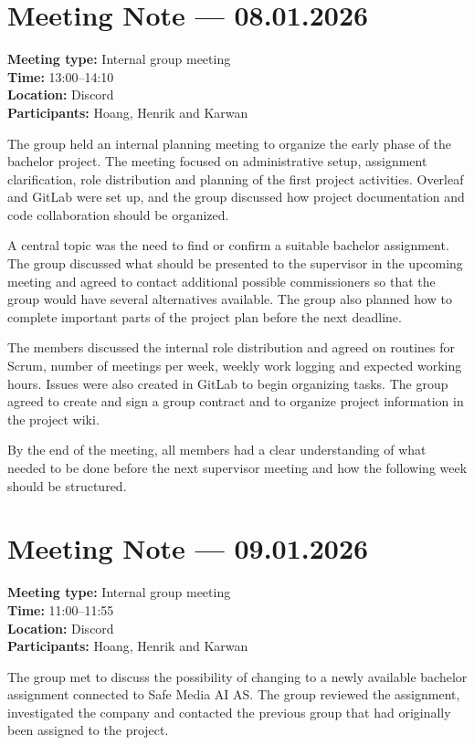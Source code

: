 \section{Meeting Note --- 08.01.2026}
\label{app:meeting-2026-01-08}
\textbf{Meeting type:} Internal group meeting\\
\textbf{Time:} 13:00--14:10\\
\textbf{Location:} Discord\\
\textbf{Participants:} Hoang, Henrik and Karwan

The group held an internal planning meeting to organize the early phase of the bachelor project. The meeting focused on administrative setup, assignment clarification, role distribution and planning of the first project activities. Overleaf and GitLab were set up, and the group discussed how project documentation and code collaboration should be organized.

A central topic was the need to find or confirm a suitable bachelor assignment. The group discussed what should be presented to the supervisor in the upcoming meeting and agreed to contact additional possible commissioners so that the group would have several alternatives available. The group also planned how to complete important parts of the project plan before the next deadline.

The members discussed the internal role distribution and agreed on routines for Scrum, number of meetings per week, weekly work logging and expected working hours. Issues were also created in GitLab to begin organizing tasks. The group agreed to create and sign a group contract and to organize project information in the project wiki.

By the end of the meeting, all members had a clear understanding of what needed to be done before the next supervisor meeting and how the following week should be structured.

\section{Meeting Note --- 09.01.2026}
\label{app:meeting-2026-01-09}
\textbf{Meeting type:} Internal group meeting\\
\textbf{Time:} 11:00--11:55\\
\textbf{Location:} Discord\\
\textbf{Participants:} Hoang, Henrik and Karwan

The group met to discuss the possibility of changing to a newly available bachelor assignment connected to Safe Media AI AS. The group reviewed the assignment, investigated the company and contacted the previous group that had originally been assigned to the project.

